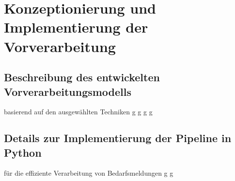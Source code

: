 \chapter{Konzeptionierung und Implementierung der Vorverarbeitung}
\label{chap:implementierung}

\section{Beschreibung des entwickelten Vorverarbeitungsmodells}
basierend auf den ausgewählten Techniken
\newpage
g
\newpage
g
\newpage
g
\newpage
g
\newpage

\section{Details zur Implementierung der Pipeline in Python}
für die effiziente Verarbeitung von Bedarfsmeldungen
\newpage
g
\newpage
g
\newpage